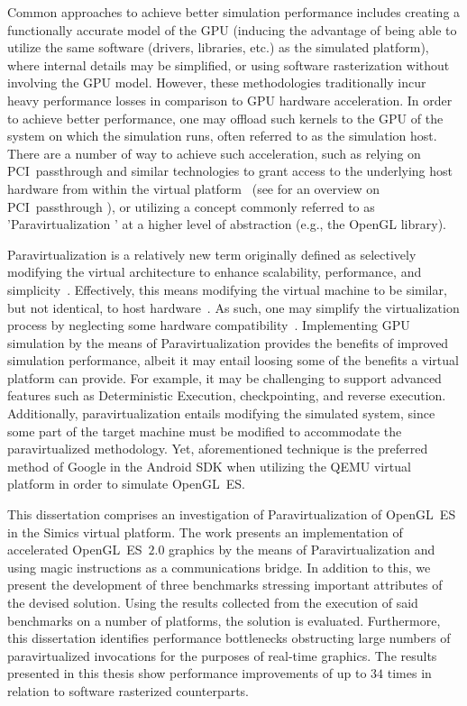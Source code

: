 Common approaches to achieve better simulation performance includes creating a functionally accurate model of the GPU (inducing the advantage of being able to utilize the same software (drivers, libraries, etc.) as the simulated platform), where internal details may be simplified, or using software rasterization without involving the GPU model.
However, these methodologies traditionally incur heavy performance losses in comparison to GPU hardware acceleration.
In order to achieve better performance, one may offload such kernels to the GPU of the system on which the simulation runs, often referred to as the simulation host.
There are a number of way to achieve such acceleration, such as relying on PCI~passthrough and similar technologies to grant access to the underlying host hardware from within the virtual platform~ (see  for an overview on PCI~passthrough ), or utilizing a concept commonly referred to as 'Paravirtualization ' at a higher level of abstraction (e.g., the OpenGL library).

Paravirtualization is a relatively new term originally defined as selectively modifying the virtual architecture to enhance scalability, performance, and simplicity~.
Effectively, this means modifying the virtual machine to be similar, but not identical, to host hardware~.
As such, one may simplify the virtualization process by neglecting some hardware compatibility~.
Implementing GPU simulation by the means of Paravirtualization provides the benefits of improved simulation performance, albeit it may entail loosing some of the benefits a virtual platform can provide.
For example, it may be challenging to support advanced features such as Deterministic Execution, checkpointing, and reverse execution.
Additionally, paravirtualization entails modifying the simulated system, since some part of the target machine must be modified to accommodate the paravirtualized methodology.
Yet, aforementioned technique is the preferred method of Google in the Android SDK when utilizing the QEMU virtual platform in order to simulate OpenGL~ES.

This dissertation comprises an investigation of Paravirtualization of OpenGL~ES in the Simics virtual platform.
The work presents an implementation of accelerated OpenGL~ES~$2.0$ graphics by the means of Paravirtualization and using magic instructions as a communications bridge.
In addition to this, we present the development of three benchmarks stressing important attributes of the devised solution.
Using the results collected from the execution of said benchmarks on a number of platforms, the solution is evaluated.
Furthermore, this dissertation identifies performance bottlenecks obstructing large numbers of paravirtualized invocations for the purposes of real-time graphics.
The results presented in this thesis show performance improvements of up to $34$ times in relation to software rasterized counterparts.

